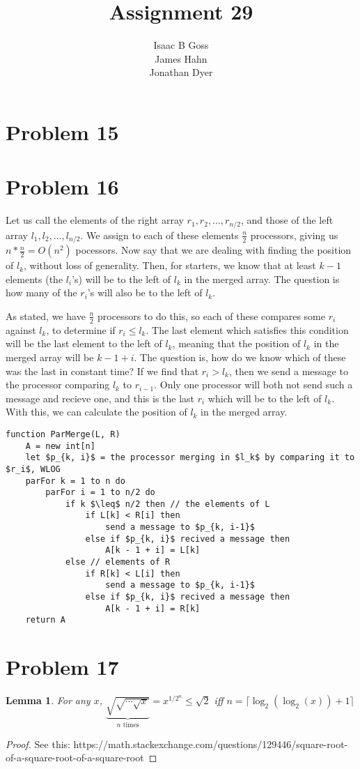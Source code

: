 \documentclass{article}
\author{Isaac B Goss\\ James Hahn\\ Jonathan Dyer}
\title{Assignment 29}
\newtheorem{lemma}{Lemma}
\providecommand{\prob}[1]{\section*{Problem #1}}
\begin{document}
\maketitle

\prob{15}

\prob{16}
Let us call the elements of the right array $r_1, r_2, \dots, r_{n/2}$, and those of the left array $l_1, l_2, \dots, l_{n/2}$.
We assign to each of these elements $\frac{n}{2}$ processors, giving us $n * \frac{n}{2} = O(n^2)$ pocessors.
Now say that we are dealing with finding the position of $l_k$, without loss of generality.
Then, for starters, we know that at least $k-1$ elements (the $l_i$'s) will be to the left of $l_k$ in the merged array.
The question is how many of the $r_i$'s will also be to the left of $l_k$.

As stated, we have $\frac{n}{2}$ processors to do this, so each of these compares some $r_i$ against $l_k$, to determine if $r_i \leq l_k$.
The last element which satisfies this condition will be the last element to the left of $l_k$, meaning that the position of $l_k$ in the merged array will be $k - 1 + i$.
The question is, how do we know which of these was the last in constant time?
If we find that $r_i > l_k$, then we send a message to the processor comparing $l_k$ to $r_{i-1}$.
Only one processor will both not send such a message and recieve one, and this is the last $r_i$ which will be to the left of $l_k$.
With this, we can calculate the position of $l_k$ in the merged array.

\begin{lstlisting}
function ParMerge(L, R)
    A = new int[n]
    let $p_{k, i}$ = the processor merging in $l_k$ by comparing it to $r_i$, WLOG
    parFor k = 1 to n do
        parFor i = 1 to n/2 do
            if k $\leq$ n/2 then // the elements of L
                if L[k] < R[i] then
                    send a message to $p_{k, i-1}$
                else if $p_{k, i}$ recived a message then
                    A[k - 1 + i] = L[k]
            else // elements of R
                if R[k] < L[i] then
                    send a message to $p_{k, i-1}$
                else if $p_{k, i}$ recived a message then
                    A[k - 1 + i] = R[k]
    return A
\end{lstlisting}

\pagebreak
\prob{17}
\begin{lemma}
    For any $x$, $\underbrace{\sqrt{\sqrt{\cdots\sqrt{x}}}}_{n\text{ times}}=x^{1/2^n}\leq \sqrt{2}$ iff $n = \lceil\log_2(\log_2(x))+1\rceil$
\end{lemma}
\begin{proof}
    See this: https://math.stackexchange.com/questions/129446/square-root-of-a-square-root-of-a-square-root
\end{proof}
\end{document}
